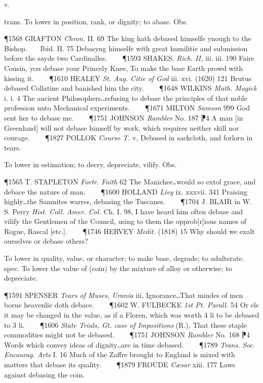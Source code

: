 \begin{description}[wide, labelwidth=!, labelindent=0pt]
 v.

\noindent {}

\vspace{-0.3cm}

\begin{myenumerate}

 trans. To lower in position, rank, or dignity; to abase. Obs.

\P 1568 GRAFTON  \textit{Chron.} II. 69 The king hath debased himselfe ynough to the Bishop.    Ibid. II. 75 Debasyng himselfe with great humilitie and submission before the sayde two Cardinalles.    
\P 1593 SHAKES.  \textit{Rich. II,} iii. iii. 190 Faire Cousin, you debase your Princely Knee, To make the base Earth prowd with kissing it.    
\P 1610 HEALEY  \textit{St. Aug. Citie of God} iii. xvi. (1620) 121 Brutus debased Collatine and banished him the city.    
\P 1648 WILKINS  \textit{Math. Magick} i. i. 4 The ancient Philosophers‥refusing to debase the principles of that noble profession unto Mechanical experiments.    
\P 1671 MILTON  \textit{Samson} 999 God sent her to debase me.    
\P 1751 JOHNSON  \textit{Rambler} No. 187 ⁋4 A man [in Greenland] will not debase himself by work, which requires neither skill nor courage.    
\P 1827 POLLOK  \textit{Course T.} v, Debased in sackcloth, and forlorn in tears.

 To lower in estimation; to decry, depreciate, vilify. Obs.

\P 1565 T. STAPLETON  \textit{Fortr. Faith} 62 The Manichee‥would so extol grace, and debace the nature of man.    
\P 1600 HOLLAND  \textit{Livy} ix. xxxvii. 341 Praising highly‥the Samnites warres, debasing the Tuscanes.    
\P 1704 J. BLAIR in  W. S. Perry \textit{Hist. Coll. Amer. Col.} Ch. I. 98, I have heard him often debase and vilify the Gentlemen of the Council, using to them the opprob[r]ious names of Rogue, Rascal [etc.].    
\P 1746 HERVEY  \textit{Medit.} (1818) 15 Why should we exalt ourselves or debase others?

 To lower in quality, value, or character; to make base, degrade; to adulterate.  spec. To lower the value of (coin) by the mixture of alloy or otherwise; to depreciate.

\P 1591 SPENSER  \textit{Tears of Muses, Urania} iii, Ignorance‥That mindes of men borne heavenlie doth debace.    
\P 1602 W. FULBECKE  \textit{1st Pt. Parall.} 54 Or els it may be changed in the value, as if a Floren, which was worth 4 li to be debased to 3 li.    
\P 1606 \textit{State  Trials, Gt. case of Impositions} (R.), That these staple commodities might not be debased.    
\P 1751 JOHNSON  \textit{Rambler} No. 168 ⁋4 Words which convey ideas of dignity‥are in time debased.    
\P 1789 \textit{Trans.  Soc. Encourag. Arts} I. 16 Much of the Zaffre brought to England is mixed with matters that debase its quality.    
\P 1879 FROUDE  \textit{Cæsar} xiii. 177 Laws against debasing the coin.
\end{myenumerate}



\end{description}
